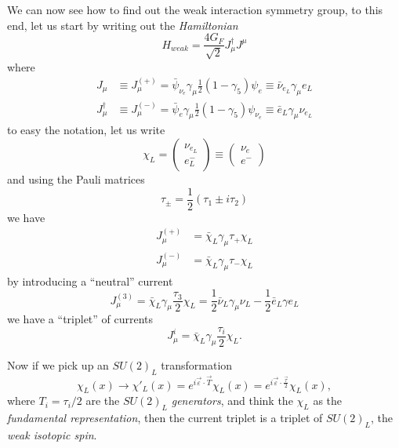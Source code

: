 We can now see how to find out the weak interaction symmetry group, to this end,
let us start by writing out the \emph{Hamiltonian}
\begin{equation}
  H_{weak} = \frac{4 G_F}{\sqrt{2}} J_\mu^\dagger J^\mu
\end{equation}
where
\begin{equation}
  \begin{split}
    J_\mu & \equiv J_\mu^{(+)} = \bar{\psi}_{\nu_e} \gamma_\mu \frac{1}{2} (1 -
    \gamma_5) \psi_e \equiv \bar{\nu}_{e_L}
    \gamma_\mu e_L \\
    J_\mu^\dagger & \equiv J_\mu^{(-)} = \bar{\psi}_e \gamma_\mu \frac{1}{2} (1
    - \gamma_5) \psi_{\nu_e} \equiv \bar{e}_L \gamma_\mu \nu_{e_L}
  \end{split}
\end{equation}
to easy the notation, let us write
\begin{equation}
  \chi_L =
  \begin{pmatrix}
    \nu_{e_L} \\ e^-_L
  \end{pmatrix}
  \equiv
  \begin{pmatrix}
    \nu_e \\ e^-
  \end{pmatrix}
\end{equation}
and using the Pauli matrices
\begin{equation}
  \tau_\pm = \frac{1}{2}( \tau_1 \pm i \tau_2)
\end{equation}
we have
\begin{equation}
  \begin{split}
    J_\mu^{(+)} &= \bar{\chi}_L \gamma_\mu \tau_+ \chi_L \\
    J_\mu^{(-)} &= \bar{\chi}_L \gamma_\mu \tau_- \chi_L
  \end{split}
\end{equation}
by introducing a ``neutral'' current
\begin{equation}
  J_\mu^{(3)} = \bar{\chi}_L \gamma_\mu \frac{\tau_3}{2} \chi_L = \frac{1}{2} \bar{\nu}_L \gamma_\mu \nu_L - \frac{1}{2} \bar{e}_L \gamma e_L
\end{equation}
we have a ``triplet'' of currents
\begin{equation}
  \label{eq:1}
  J_\mu^i = \bar{\chi}_L \gamma_\mu \frac{\tau_i}{2} \chi_L.
\end{equation}

Now if we pick up an $SU(2)_L$ transformation
\begin{equation}
  \chi_L (x) \to \chi'_L (x) = e^{i \vec{\varepsilon} \cdotp \vec{T}} \chi_L(x) = e^{i \vec{\varepsilon} \cdotp \frac{\vec{\tau}}{2}} \chi_L(x),
\end{equation}
where $T_i = \tau_i / 2$ are the $SU(2)_L$ \emph{generators}, and think the
$\chi_L$ as the \emph{fundamental representation}, then the current triplet is a
triplet of $SU(2)_L$, the \emph{weak isotopic spin}.

